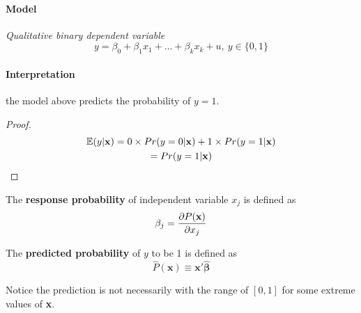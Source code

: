 \documentclass[]{article}
\begin{document}
			\paragraph{Model} \emph{Qualitative binary dependent variable}
			\[
				y = \beta_0 + \beta_1 x_1 + \dots + \beta_k x_k + u,\ y \in \{0, 1\}
			\]
			\paragraph{Interpretation} the model above predicts the probability of $y=1$.
				\begin{proof}
					\begin{gather*}
						\mathbb{E}({y|\textbf{x}}) = 0 \times Pr(y=0|\textbf{x}) + 1 \times Pr(y=1|\textbf{x}) \\
						= Pr(y=1|\textbf{x})
					\end{gather*}
				\end{proof}
				
			\begin{definition}
				The \textbf{response probability} of independent variable $x_j$ is defined as
				\begin{equation}
					\beta_j = \frac{\partial{P(\textbf{x})}}{\partial{x_j}}
				\end{equation}
			\end{definition}
			
			\begin{definition}
				The \textbf{predicted probability} of $y$ to be 1 is defined as
				\begin{equation}
					\hat{P}(\textbf{x}) \equiv \textbf{x}' \hat{\bm{\beta}}
				\end{equation}
			\end{definition}
			
			\begin{remark}[\textcolor{red}{Out-of-range predictions}]
				Notice the prediction is not necessarily with the range of $[0,1]$ for some extreme values of \textbf{x}.
			\end{remark}
			
\end{document}
